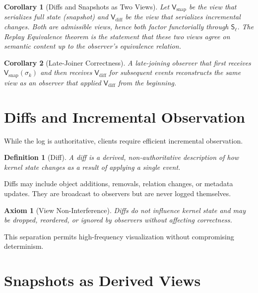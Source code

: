 \documentclass[11pt]{article}
\newtheorem{definition}{Definition}[section]
\newtheorem{axiom}{Axiom}[section]
\newtheorem{corollary}{Corollary}[section]
\begin{document}
\begin{corollary}[Diffs and Snapshots as Two Views]
Let $\mathsf{V}_{\mathrm{snap}}$ be the view that serializes full state (snapshot) and $\mathsf{V}_{\mathrm{diff}}$ be the view that serializes incremental changes. Both are admissible views, hence both factor functorially through $\mathsf{S}_\ell$. The Replay Equivalence theorem is the statement that these two views agree on semantic content up to the observer's equivalence relation.
\end{corollary}

\begin{corollary}[Late-Joiner Correctness]
\label{cor:late-joiner}
A late-joining observer that first receives $\mathsf{V}_{\mathrm{snap}}(\sigma_k)$ and then receives $\mathsf{V}_{\mathrm{diff}}$ for subsequent events reconstructs the same view as an observer that applied $\mathsf{V}_{\mathrm{diff}}$ from the beginning.
\end{corollary}

\section{Diffs and Incremental Observation}

While the log is authoritative, clients require efficient incremental observation.

\begin{definition}[Diff]
A diff is a derived, non-authoritative description of how kernel state changes as a result of applying a single event.
\end{definition}

Diffs may include object additions, removals, relation changes, or metadata updates. They are broadcast to observers but are never logged themselves.

\begin{axiom}[View Non-Interference]
Diffs do not influence kernel state and may be dropped, reordered, or ignored by observers without affecting correctness.
\end{axiom}

This separation permits high-frequency visualization without compromising determinism.

\section{Snapshots as Derived Views}
\end{document}

